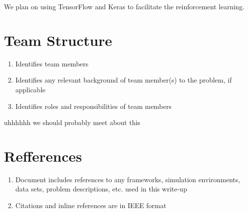 \documentclass[11pt]{article}
\begin{document}
We plan on using TensorFlow and Keras to facilitate the reinforcement learning.

\section{Team Structure}
\begin{enumerate}
\item Identifies team members
\item Identifies any relevant background of team member(s) to the problem, if applicable
\item Identifies roles and responsibilities of team members
\end{enumerate}
uhhhhhh we should probably meet about this

\section{Refferences}
\begin{enumerate}
\item Document includes references to any frameworks, simulation environments, data sets, problem descriptions,
  etc. used in this write-up
\item Citations and inline references are in IEEE format
\end{enumerate}
\printbibliography
\end{document}
